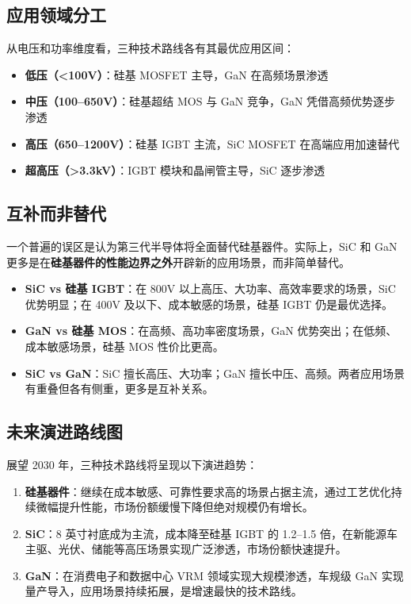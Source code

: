 \subsection{应用领域分工}

从电压和功率维度看，三种技术路线各有其最优应用区间：

\begin{itemize}[leftmargin=2em]
\item \textbf{低压（<100V）}：硅基 MOSFET 主导，GaN 在高频场景渗透
\item \textbf{中压（100–650V）}：硅基超结 MOS 与 GaN 竞争，GaN 凭借高频优势逐步渗透
\item \textbf{高压（650–1200V）}：硅基 IGBT 主流，SiC MOSFET 在高端应用加速替代
\item \textbf{超高压（>3.3kV）}：IGBT 模块和晶闸管主导，SiC 逐步渗透
\end{itemize}

\subsection{互补而非替代}

一个普遍的误区是认为第三代半导体将全面替代硅基器件。实际上，SiC 和 GaN 更多是在\textbf{硅基器件的性能边界之外}开辟新的应用场景，而非简单替代。

\begin{itemize}[leftmargin=2em]
\item \textbf{SiC vs 硅基 IGBT}：在 800V 以上高压、大功率、高效率要求的场景，SiC 优势明显；在 400V 及以下、成本敏感的场景，硅基 IGBT 仍是最优选择。
\item \textbf{GaN vs 硅基 MOS}：在高频、高功率密度场景，GaN 优势突出；在低频、成本敏感场景，硅基 MOS 性价比更高。
\item \textbf{SiC vs GaN}：SiC 擅长高压、大功率；GaN 擅长中压、高频。两者应用场景有重叠但各有侧重，更多是互补关系。
\end{itemize}

\subsection{未来演进路线图}

展望 2030 年，三种技术路线将呈现以下演进趋势：

\begin{enumerate}[leftmargin=2em]
\item \textbf{硅基器件}：继续在成本敏感、可靠性要求高的场景占据主流，通过工艺优化持续微幅提升性能，市场份额缓慢下降但绝对规模仍有增长。
\item \textbf{SiC}：8 英寸衬底成为主流，成本降至硅基 IGBT 的 1.2–1.5 倍，在新能源车主驱、光伏、储能等高压场景实现广泛渗透，市场份额快速提升。
\item \textbf{GaN}：在消费电子和数据中心 VRM 领域实现大规模渗透，车规级 GaN 实现量产导入，应用场景持续拓展，是增速最快的技术路线。
\end{enumerate}

